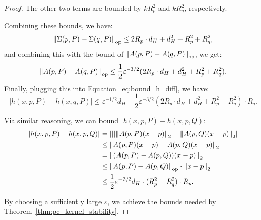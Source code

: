 \begin{proof}
    The other two terms are bounded by $k R_p^2$ and $k R_q^2$, respectively.

    Combining these bounds, we have:
    \begin{equation}
        \norm{\Sigma(p, P) - \Sigma(q, P)}_{\mathrm{op}} \leq 2R_p \cdot d_H + d_H^2 + R_p^2 + R_q^2,
    \end{equation}
    and combining this with the bound of $\norm{A(p, P) - A(q, P)}_{\mathrm{op}}$, we get:
    \begin{equation}
        \norm{A(p, P) - A(q, P)}_{\mathrm{op}} \leq \frac{1}{2} \varepsilon^{-3/2} (2R_p \cdot d_H + d_H^2 + R_p^2 + R_q^2).
    \end{equation}
    Finally, plugging this into
    Equation~\eqref{eq:bound_h_diff}, we have:
    \begin{equation}
        |h(x, p, P) - h(x, q, P)| \leq \varepsilon^{-1/2} d_H + \frac{1}{2} \varepsilon^{-3/2} (2R_p \cdot d_H + d_H^2 + R_p^2 + R_q^2) \cdot R_q.
    \end{equation}
    
    Via similar reasoning, we can bound $|h(x, p, P) - h(x, p, Q)$:
    \begin{align}
        |h(x, p, P) - h(x, p, Q)| & = |||\norm{A(p, P) (x - p)}_2 - \norm{A(p, Q) (x - p)}_2| \\
        & \leq \norm{A(p, P) (x - p) - A(p, Q) (x - p)}_2 \\
        & = \norm{(A(p, P) - A(p, Q)) (x - p)}_2 \\
        & \leq \norm{A(p, P) - A(p, Q)}_{\mathrm{op}} \cdot \norm{x - p}_2 \\
        & \leq \frac{1}{2} \varepsilon^{-3/2} d_H \cdot (R_p^2 + R_q^2) \cdot R_p.
    \end{align}

    By choosing a sufficiently large $\varepsilon$, we achieve the bounds needed
    by Theorem~\ref{thm:pc_kernel_stability}.
\end{proof}
